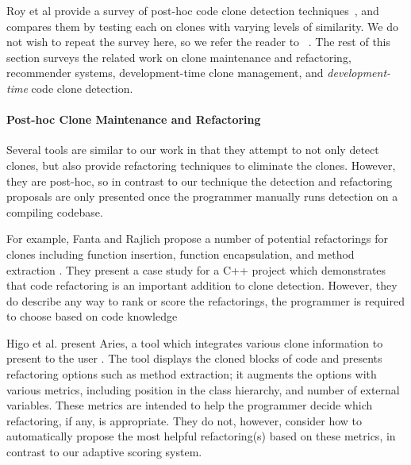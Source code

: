 \documentclass[nocopyrightspace,10pt]{sigplanconf}
\begin{document}
Roy et al provide a survey of post-hoc code clone detection
techniques~\cite{Roy2009}, and compares them by testing 
each on clones with varying levels of similarity. We do not wish 
to repeat the survey here, so we refer the reader to ~\cite{Roy2009}.
The rest of this section surveys the
related work on clone maintenance and refactoring, recommender systems,
development-time clone management, and \emph{development-time} code clone detection.

\paragraph{Post-hoc Clone Maintenance and Refactoring}


Several tools are similar to our work in that they attempt to not only
detect clones, but also provide refactoring techniques to eliminate the clones.  However,
they are post-hoc, so in contrast to our technique
 the detection and refactoring proposals are only presented once the 
programmer manually runs detection on a compiling codebase.

For example, Fanta and Rajlich propose a number of
potential refactorings for clones including function insertion, function encapsulation,
and method extraction \cite{Fanta1999}.  They 
present a case study for a C++ project which demonstrates that code refactoring is an important 
addition to clone detection. However, they do describe any way to rank or score the refactorings,
the programmer is required to choose based on code knowledge

Higo et al. present Aries, a tool which integrates various clone
information to present to the user \cite{Higo2008}.  The tool displays the
cloned blocks of code and presents refactoring options such as method
extraction; it augments the options with various metrics, including position in
the class hierarchy, and number of external variables. These metrics
are intended to help the programmer decide which refactoring, if any,
is appropriate. They do not, however, consider how to automatically 
propose the most helpful refactoring(s) based on these metrics, in contrast 
to our adaptive scoring system.
\end{document}
